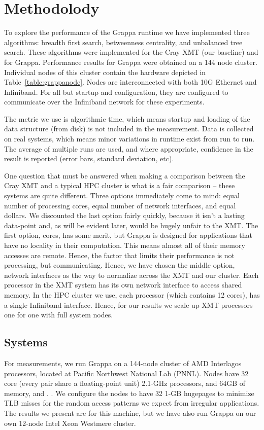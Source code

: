 \section{Methodolody} \label{sec:method}

To explore the performance of the Grappa runtime we have implemented three algorithms: breadth first search, betweenness centrality, and unbalanced tree search.  These algorithms were implemented for the Cray XMT (our baseline) and for Grappa.  Performance results for Grappa were obtained on a 144 node cluster.  Individual nodes of this cluster contain the hardware depicted in Table~\ref{table:grappanode}.  Nodes are interconnected with both 10G Ethernet and Infiniband.  For all but startup and configuration, they are configured to communicate over the Infiniband network for these experiments.

The metric we use is algorithmic time, which means startup and loading of the data structure (from disk) is not included in the measurement.  Data is collected on real systems, which means minor variations in runtime exist from run to run.  The average of multiple runs are used, and where appropriate, confidence in the result is reported (error bars, standard deviation, etc).

One question that must be answered when making a comparison between the Cray XMT and a typical HPC cluster is what is a fair comparison -- these systems are quite different.  Three options immediately come to mind: equal number of processing cores, equal number of network interfaces, and equal dollars.  We discounted the last option fairly quickly, because it isn't a lasting data-point and, as will be evident later, would be hugely unfair to the XMT.  The first option, cores, has some merit, but Grappa is designed for applications that have no locality in their computation.  This means almost all of their memory accesses are remote.  Hence, the factor that limits their performance is not processing, but communicating.  Hence, we have chosen the middle option, network interfaces as the way to normalize across the XMT and our cluster.  Each processor in the XMT system has its own network interface to access shared memory.  In the HPC cluster we use, each processor (which contains 12 cores), has a single Infiniband interface.  Hence, for our results we scale up XMT processors one for one with full system nodes.

\subsection{Systems}
For measurements, we run Grappa on a 144-node cluster of AMD
Interlagos processors, located at Pacific Northwest National Lab
(PNNL). Nodes have 32 core (every pair share a floating-point
unit) 2.1-GHz processors, and 64GB of memory, and . . We configure the nodes to have 32 1-GB
hugepages to minimize TLB misses for the random access patterns we
expect from irregular applications. The results we present are for
this machine, but we have also run Grappa on our own 12-node Intel
Xeon Westmere cluster.

